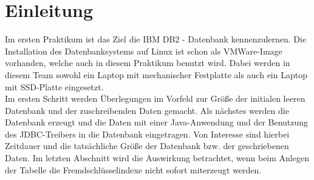 \chapter{Einleitung}
Im ersten Praktikum ist das Ziel die IBM DB2 - Datenbank kennenzulernen. Die Installation des Datenbanksystems auf Linux ist schon als VMWare-Image vorhanden, welche auch in diesem Praktikum benutzt wird. Dabei werden in diesem Team sowohl ein Laptop mit mechanischer Festplatte als auch ein Laptop mit SSD-Platte eingesetzt.\\

Im ersten Schritt werden Überlegungen im Vorfeld zur Größe der initialen leeren Datenbank und der zuschreibenden Daten gemacht. Als nächstes werden die Datenbank erzeugt und die Daten mit einer Java-Anwendung und der Benutzung des JDBC-Treibers in die Datenbank eingetragen. Von Interesse sind hierbei Zeitdauer und die tatsächliche Größe der Datenbank bzw. der geschriebenen Daten. Im letzten Abschnitt wird die Auswirkung betrachtet, wenn beim Anlegen der Tabelle die Fremdschlüsselindexe nicht sofort miterzeugt werden.